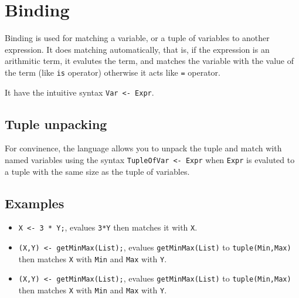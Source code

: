 \section{Binding}

Binding is used for matching a variable, or a tuple of variables to
another expression. It does matching automatically, that is, if the
expression is an arithmitic term, it evalutes the term, and
matches the variable with the value of the term (like \texttt{is}
operator) otherwise it acts like \texttt{=} operator.

It have the intuitive syntax \texttt{Var <- Expr}. 

\subsection{Tuple unpacking}

For convinence, the language allows you to unpack the tuple and match with named variables
using the syntax \texttt{TupleOfVar <- Expr} when \texttt{Expr} is evaluted to a tuple with
the same size as the tuple of variables.

\subsection{Examples}

\begin{itemize}
	\item \texttt{X <- 3 * Y;}, evalues \texttt{3*Y} then matches it with \texttt{X}.
	\item \texttt{(X,Y) <- getMinMax(List);}, evalues \texttt{getMinMax(List)} to \texttt{tuple(Min,Max)} then
	      matches \texttt{X} with \texttt{Min} and \texttt{Max} with \texttt{Y}.
	\item \texttt{(X,Y) <- getMinMax(List);}, evalues \texttt{getMinMax(List)} to \texttt{tuple(Min,Max)} then
	      matches \texttt{X} with \texttt{Min} and \texttt{Max} with \texttt{Y}.
\end{itemize}

